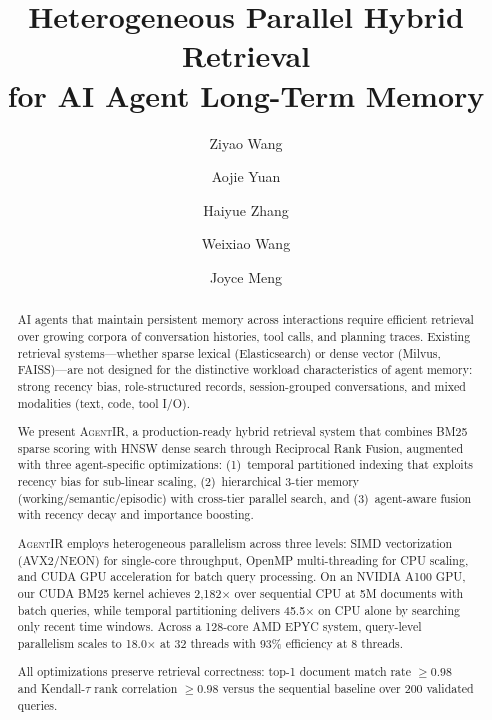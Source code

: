 \documentclass[sigconf,nonacm,anonymous]{acmart}
\newcommand{\sysname}{\textsc{AgentIR}}
\newcommand{\speedup}[1]{#1$\times$}
\begin{document}
\title{Heterogeneous Parallel Hybrid Retrieval \\for AI Agent Long-Term Memory}

\author{Ziyao Wang}

\author{Aojie Yuan}

\author{Haiyue Zhang}

\author{Weixiao Wang}

\author{Joyce Meng}

\begin{abstract}
AI agents that maintain persistent memory across interactions require
efficient retrieval over growing corpora of conversation histories,
tool calls, and planning traces.  Existing retrieval systems---whether
sparse lexical (Elasticsearch) or dense vector (Milvus, FAISS)---are
not designed for the distinctive workload characteristics of agent
memory: strong recency bias, role-structured records, session-grouped
conversations, and mixed modalities (text, code, tool I/O).

We present \sysname{}, a production-ready hybrid retrieval system
that combines BM25 sparse scoring with HNSW dense search through
Reciprocal Rank Fusion, augmented with three agent-specific
optimizations: (1)~temporal partitioned indexing that exploits
recency bias for sub-linear scaling, (2)~hierarchical 3-tier memory
(working/semantic/episodic) with cross-tier parallel search, and
(3)~agent-aware fusion with recency decay and importance boosting.

\sysname{} employs heterogeneous parallelism across three levels:
SIMD vectorization (AVX2/NEON) for single-core throughput, OpenMP
multi-threading for CPU scaling, and CUDA GPU acceleration for
batch query processing.  On an NVIDIA A100 GPU, our CUDA BM25 kernel
achieves \speedup{2,182} over sequential CPU at 5M documents with
batch queries, while temporal partitioning delivers \speedup{45.5}
on CPU alone by searching only recent time windows.  Across a
128-core AMD EPYC system, query-level parallelism scales to
\speedup{18.0} at 32 threads with 93\% efficiency at 8 threads.

All optimizations preserve retrieval correctness: top-1 document
match rate $\geq 0.98$ and Kendall-$\tau$ rank correlation $\geq 0.98$
versus the sequential baseline over 200 validated queries.
\end{abstract}
\end{document}
